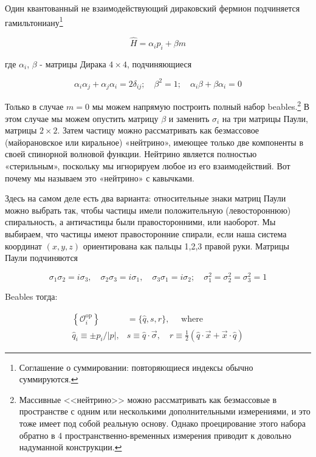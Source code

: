 \documentclass[main.tex]{subfiles}
\begin{document}
Один квантованный не взаимодействующий дираковский фермион подчиняется гамильтониану\footnote{Соглашение о суммировании: повторяющиеся индексы обычно суммируются.}

\begin{equation}\label{15.13}
	\hat H = \alpha_i p_i + \beta m
\end{equation}

где $\alpha_i$, $\beta$ - матрицы Дирака $4\times 4$, подчиняющиеся

\begin{equation}\label{15.14}
	\alpha_{i} \alpha_{j}+\alpha_{j} \alpha_{i}=2 \delta_{i j} ; \quad \beta^{2}=1 ; \quad \alpha_{i} \beta+\beta \alpha_{i}=0
\end{equation}

Только в случае $m = 0$ мы можем напрямую построить полный набор beables.\footnote{Массивные <<нейтрино>> можно рассматривать как безмассовые в пространстве с одним или несколькими дополнительными измерениями, и это тоже имеет под собой реальную основу. Однако проецирование этого набора обратно в 4 пространственно-временных измерения приводит к довольно надуманной конструкции.} В этом случае мы можем опустить матрицу $\beta$ и заменить $\sigma_i$ на три матрицы Паули, матрицы $2 \times 2$. Затем частицу можно рассматривать как безмассовое (майорановское или киральное) «нейтрино», имеющее только две компоненты в своей спинорной волновой функции. Нейтрино является полностью «стерильным», поскольку мы игнорируем любое из его взаимодействий. Вот почему мы называем это «нейтрино» с кавычками.

Здесь на самом деле есть два варианта: относительные знаки матриц Паули можно выбрать так, чтобы частицы имели положительную (левостороннюю) спиральность, а античастицы были правосторонними, или наоборот. Мы выбираем, что частицы имеют правосторонние спирали, если наша система координат $(x, y, z)$ ориентирована как пальцы 1,2,3 правой руки. Матрицы Паули подчиняются

\begin{equation}\label{15.15}
	\sigma_{1} \sigma_{2}=i \sigma_{3}, \quad \sigma_{2} \sigma_{3}=i \sigma_{1}, \quad \sigma_{3} \sigma_{1}=i \sigma_{2} ; \quad \sigma_{1}^{2}=\sigma_{2}^{2}=\sigma_{3}^{2}=1
\end{equation}

Beables тогда:

\begin{equation}\label{15.16}
	\begin{aligned}\left\{\mathcal{O}_{i}^{\mathrm{op}}\right\} &=\{\hat{q}, s, r\}, \quad \text { where } \\ \hat{q}_{i} \equiv \pm p_{i}/| p |, & s \equiv \hat{q} \cdot \vec{\sigma}, \quad r \equiv \frac{1}{2}(\hat{q} \cdot \vec{x}+\vec{x} \cdot \hat{q}) \end{aligned}
\end{equation}
\end{document}

